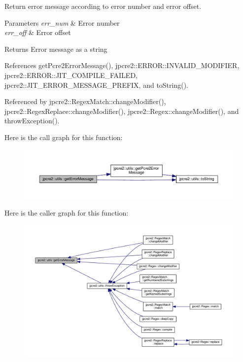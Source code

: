 Return error message according to error number and error offset.


\begin{DoxyParams}{Parameters}
{\em err\+\_\+num} & Error number \\
\hline
{\em err\+\_\+off} & Error offset \\
\hline
\end{DoxyParams}
\begin{DoxyReturn}{Returns}
Error message as a string 
\end{DoxyReturn}


References get\+Pcre2\+Error\+Message(), jpcre2\+::\+E\+R\+R\+O\+R\+::\+I\+N\+V\+A\+L\+I\+D\+\_\+\+M\+O\+D\+I\+F\+I\+ER, jpcre2\+::\+E\+R\+R\+O\+R\+::\+J\+I\+T\+\_\+\+C\+O\+M\+P\+I\+L\+E\+\_\+\+F\+A\+I\+L\+ED, jpcre2\+::\+J\+I\+T\+\_\+\+E\+R\+R\+O\+R\+\_\+\+M\+E\+S\+S\+A\+G\+E\+\_\+\+P\+R\+E\+F\+IX, and to\+String().



Referenced by jpcre2\+::\+Regex\+Match\+::change\+Modifier(), jpcre2\+::\+Regex\+Replace\+::change\+Modifier(), jpcre2\+::\+Regex\+::change\+Modifier(), and throw\+Exception().



Here is the call graph for this function\+:\nopagebreak
\begin{figure}[H]
\begin{center}
\leavevmode
\includegraphics[width=350pt]{namespacejpcre2_1_1utils_a58db3a9ce0296d70469611445cb42209_cgraph}
\end{center}
\end{figure}




Here is the caller graph for this function\+:\nopagebreak
\begin{figure}[H]
\begin{center}
\leavevmode
\includegraphics[width=350pt]{namespacejpcre2_1_1utils_a58db3a9ce0296d70469611445cb42209_icgraph}
\end{center}
\end{figure}


